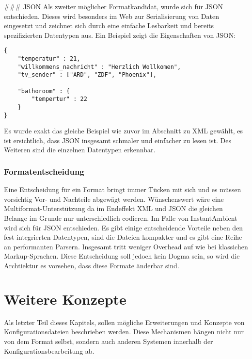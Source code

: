 ### JSON 
Als zweiter möglicher Formatkandidat, wurde sich für JSON entschieden. Dieses wird besonders im Web zur Serialisierung von Daten eingesetzt und zeichnet sich durch eine einfache Lesbarkeit und bereits spezifizierten Datentypen aus. Ein Beispiel zeigt die Eigenschaften von JSON:

\lstset{language=bash}
\begin{lstlisting}[caption=JSON Konfiguration, captionpos=b]
{
	"temperatur" : 21,
	"willkommens_nachricht" : "Herzlich Wollkomen", 
	"tv_sender" : ["ARD", "ZDF", "Phoenix"], 

	"bathoroom" : {
		"tempertur" : 22
	}
}
\end{lstlisting}

Es wurde exakt das gleiche Beispiel wie zuvor im Abschnitt zu XML gewählt, es ist ersichtlich, dass JSON insgesamt schmaler und einfacher zu lesen ist. Des Weiteren sind die einzelnen Datentypen erkennbar.

\subsubsection{Formatentscheidung}
Eine Entscheidung für ein Format bringt immer Tücken mit sich und es müssen vorsichtig Vor- und Nachteile abgewägt werden. Wünschenswert wäre eine Multiformat-Unterstützung da im Endeffekt XML und JSON die gleichen Belange im Grunde nur unterschiedlich codieren. Im Falle von InstantAmbient wird sich für JSON entschieden. Es gibt einige entscheidende Vorteile neben den fest integrierten Datentypen, sind die Dateien kompakter und es gibt eine Reihe an performanten Parsern. Insgesamt tritt weniger Overhead auf wie bei klassichen Markup-Sprachen. Diese Entscheidung soll jedoch kein Dogma sein, so wird die Archtiektur es vorsehen, dass diese Formate änderbar sind. 

\section{Weitere Konzepte}
Als letzter Teil dieses Kapitels, sollen mögliche Erweiterungen und Konzepte von Konfigurationsdateien beschrieben werden. Diese Mechanismen hängen nicht nur von dem Format selbst, sondern auch anderen Systemen innerhalb der Konfigurationsbearbeitung ab. 

